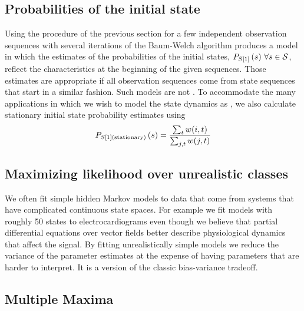 \subsection{Probabilities of the initial state}
\label{sec:Ps0}

Using the procedure of the previous section for a few independent
observation sequences with several iterations of the Baum-Welch
algorithm produces a model in which the estimates of the probabilities
of the initial states, $P_{\ti{S}{1}} \left(s \right)\,\forall s \in
\states$, reflect the characteristics at the beginning of the given
sequences.  Those estimates are appropriate if all observation
sequences come from state sequences that start in a similar fashion.
Such models are not .  To accommodate the many
applications in which we wish to model the state dynamics as
, we also calculate stationary initial state probability
estimates using
\begin{equation}
  \label{eq:Ps0stationary}
  P_{{S}{[1]}(\text{stationary})} \left(s \right) =
  \frac{\sum_{t}w(i,t)}{\sum_{j,t}w(j,t)}
\end{equation}



\subsection{Maximizing likelihood over unrealistic classes}
\label{sec:incredible}

We often fit simple hidden Markov models to data that come from
systems that have complicated continuous state spaces.  For example we
fit models with roughly 50 states to electrocardiograms even though we
believe that partial differential equations over vector fields better
describe physiological dynamics that affect the signal.  By fitting
unrealistically simple models we reduce the variance of the parameter
estimates at the expense of having parameters that are harder to
interpret.  It is a version of the classic  bias-variance tradeoff.

\subsection{Multiple Maxima}
\label{sec:MultiMax}

